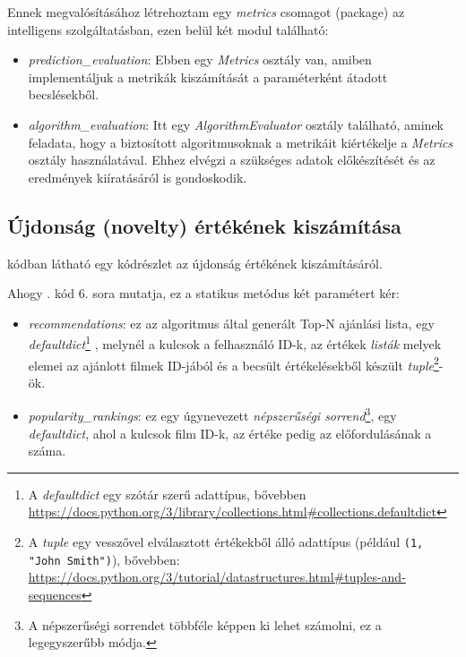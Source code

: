 \documentclass[
]{thesis-ekf}
\theoremstyle{definition}
\theoremstyle{remark}
\begin{document}
Ennek megvalósításához létrehoztam egy \emph{metrics} csomagot (package) az intelligens szolgáltatásban, ezen belül két modul található:
\begin{itemize}
	\item \emph{prediction\_evaluation}: Ebben egy \emph{Metrics} osztály van, amiben implementáljuk a metrikák kiszámítását a paraméterként átadott becslésekből.
	\item \emph{algorithm\_evaluation}: Itt egy \emph{AlgorithmEvaluator} osztály található, aminek feladata, hogy a biztosított algoritmusoknak a metrikáit kiértékelje a \emph{Metrics} osztály használatával. Ehhez elvégzi a szükséges adatok előkészítését és az eredmények kiíratásáról is gondoskodik.
\end{itemize}

\subsection{Újdonság (novelty) értékének kiszámítása}
 kódban látható egy kódrészlet az újdonság értékének kiszámításáról.



Ahogy . kód 6. sora mutatja, ez a statikus metódus két paramétert kér:
\begin{itemize}
	\item \emph{recommendations}: ez az algoritmus által generált Top-N ajánlási lista, egy \emph{defaultdict}\footnote{A \emph{defaultdict} egy szótár szerű adattípus, bővebben \url{https://docs.python.org/3/library/collections.html\#collections.defaultdict}} , melynél a kulcsok a felhasználó ID-k, az értékek \emph{listák} melyek elemei az ajánlott filmek ID-jából és a becsült értékelésekből készült \emph{tuple}\footnote{A \emph{tuple} egy vesszővel elválasztott értékekből álló adattípus (például \texttt{(1, "John Smith")}), bővebben: \url{https://docs.python.org/3/tutorial/datastructures.html\#tuples-and-sequences}}-ök.
	\item \emph{popularity\_rankings}: ez egy úgynevezett \emph{népszerűségi sorrend}\footnote{A népszerűségi sorrendet többféle képpen ki lehet számolni, ez a legegyszerűbb módja.}, egy \emph{defaultdict}, ahol a kulcsok film ID-k, az értéke pedig az előfordulásának a száma.
\end{itemize}
\end{document}
